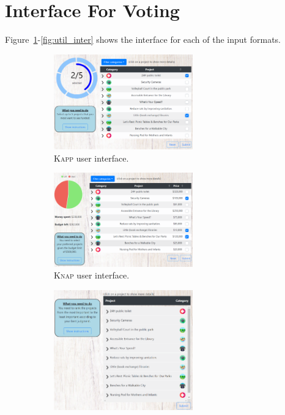 \documentclass[runningheads]{llncs}
\newcommand{\knap}{\textsc{Knap}}
\newcommand{\kapp}{\textsc{Kapp}}
\begin{document}

%

\clearpage
\appendix


\section{Interface For Voting}\label{app:interfaces}
Figure~\ref{fig:kapp_inter}-\ref{fig:util_inter} shows   the interface for each of the input formats.

\begin{figure}[ht!]
     \centering
          \begin{subfigure}[b]{0.45\textwidth}
         \centering
       \includegraphics[width=6cm]{experiment/k approval.PNG}
\caption{\kapp{} user interface.
}\label{fig:kapp_inter}
     \end{subfigure}\hfill
     \begin{subfigure}[b]{0.45\textwidth}
         \centering
         \includegraphics[width=6cm]{experiment/knapsack.PNG}
\caption{\knap{}  user interface.
}\label{fig:knap_welfare_app}
     \end{subfigure}
     \hfill
     \begin{subfigure}[b]{0.45\textwidth}
         \centering
         \includegraphics[width=6cm]{experiment/ranking.PNG}

\end{subfigure}
\end{figure}
\end{document}
